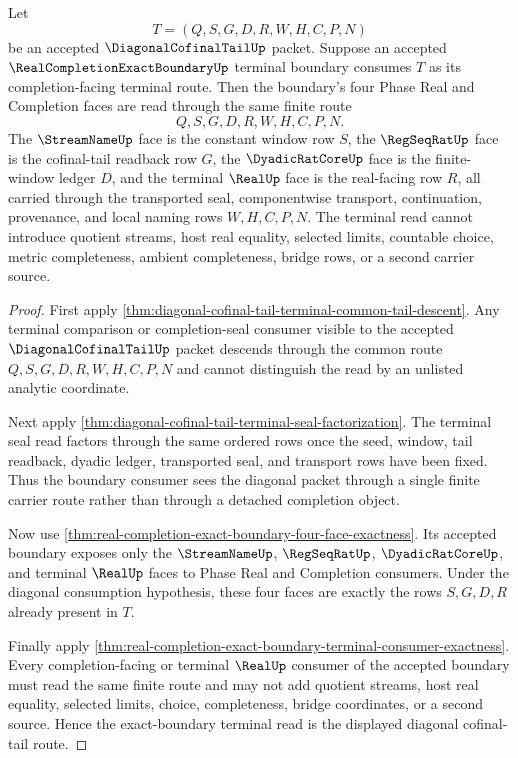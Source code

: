 \begin{theorem}
\label{thm:diagonal-cofinal-tail-exact-boundary-terminal-route}
Let
$$
T=(Q,S,G,D,R,W,H,C,P,N)
$$
be an accepted $\DiagonalCofinalTailUp$ packet. Suppose an accepted $\RealCompletionExactBoundaryUp$ terminal boundary consumes $T$ as its completion-facing terminal route. Then the boundary's four Phase Real and Completion faces are read through the same finite route
$$
Q,S,G,D,R,W,H,C,P,N.
$$
The $\StreamNameUp$ face is the constant window row $S$, the $\RegSeqRatUp$ face is the cofinal-tail readback row $G$, the $\DyadicRatCoreUp$ face is the finite-window ledger $D$, and the terminal $\RealUp$ face is the real-facing row $R$, all carried through the transported seal, componentwise transport, continuation, provenance, and local naming rows $W,H,C,P,N$. The terminal read cannot introduce quotient streams, host real equality, selected limits, countable choice, metric completeness, ambient completeness, bridge rows, or a second carrier source.
\end{theorem}
\begin{proof}
First apply \autoref{thm:diagonal-cofinal-tail-terminal-common-tail-descent}. Any terminal comparison or completion-seal consumer visible to the accepted $\DiagonalCofinalTailUp$ packet descends through the common route $Q,S,G,D,R,W,H,C,P,N$ and cannot distinguish the read by an unlisted analytic coordinate.

Next apply \autoref{thm:diagonal-cofinal-tail-terminal-seal-factorization}. The terminal seal read factors through the same ordered rows once the seed, window, tail readback, dyadic ledger, transported seal, and transport rows have been fixed. Thus the boundary consumer sees the diagonal packet through a single finite carrier route rather than through a detached completion object.

Now use \autoref{thm:real-completion-exact-boundary-four-face-exactness}. Its accepted boundary exposes only the $\StreamNameUp$, $\RegSeqRatUp$, $\DyadicRatCoreUp$, and terminal $\RealUp$ faces to Phase Real and Completion consumers. Under the diagonal consumption hypothesis, these four faces are exactly the rows $S,G,D,R$ already present in $T$.

Finally apply \autoref{thm:real-completion-exact-boundary-terminal-consumer-exactness}. Every completion-facing or terminal $\RealUp$ consumer of the accepted boundary must read the same finite route and may not add quotient streams, host real equality, selected limits, choice, completeness, bridge coordinates, or a second source. Hence the exact-boundary terminal read is the displayed diagonal cofinal-tail route.
\end{proof}

